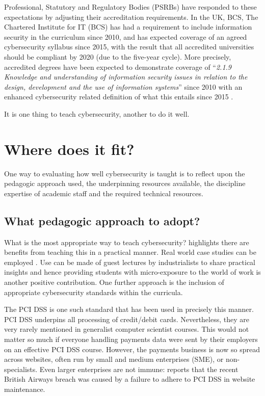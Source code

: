 \documentclass[sigconf]{acmart}
\begin{document}
Professional, Statutory and Regulatory Bodies (PSRBs) have responded to these expectations by adjusting their accreditation requirements. In the UK, BCS, The Chartered Institute for IT (BCS) has had a requirement to include information security in the curriculum since 2010, and has expected coverage of an agreed cybersecurity syllabus since 2015, with the result that all accredited universities should be compliant by 2020 (due to the five-year cycle). More precisely, accredited degrees have been expected to demonstrate coverage of ``{\emph{2.1.9 Knowledge and understanding of information security issues in relation to the design, development and the use of information systems}}'' \cite[p.~30]{BCS2018a} since 2010 with an enhanced cybersecurity related definition of what this entails since 2015 \cite[p.~17--18]{BCS2018a}.

It is one thing to teach cybersecurity, another to do it well. %

\section {Where does it fit?	}


One way to evaluating how well cybersecurity is taught is to reflect upon the pedagogic approach used, the underpinning resources available, the discipline expertise of academic staff and the required technical resources.

\subsection{What pedagogic approach to adopt? }
What is the most appropriate way to teach cybersecurity? \cite{Weiss:2013:THC:2527148.2527180} highlights there are benefits from teaching this in a practical manner. Real world case studies can be employed \cite{BritishAirways2018a}. Use can be made of guest lectures by industrialists to share practical insights and hence providing students with micro-exposure to the world of work is another positive contribution. One further approach is the inclusion of appropriate cybersecurity standards within the curricula.

The PCI DSS \cite{PCI2018b} is one such standard that has been used in precisely this manner. PCI DSS underpins all processing of credit/debit cards. Nevertheless, they are very rarely mentioned in generalist computer scientist courses. This would not matter so much if everyone handling payments data were sent by their employers on an effective PCI DSS course. However, the payments business is now so spread across websites, often run by small and medium enterprises (SME), or non-specialists. Even larger enterprises are not immune: \cite{BritishAirways2018a} reports that the recent British Airways breach was caused by a failure to adhere to PCI DSS in website maintenance.
\end{document}
